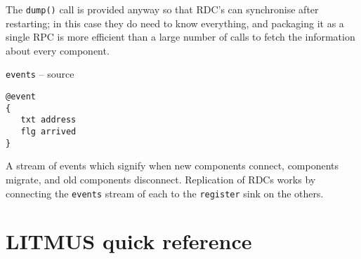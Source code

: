 \documentclass[12pt,a4paper,twoside]{article}
\renewcommand{\_}{\texttt{\symbol{95}}}
\begin{document}
\begin{bulletlist}
The \verb^dump()^ call is provided anyway so that RDC's can
synchronise after restarting; in this case they do need to know
everything, and packaging it as a single RPC is more efficient
than a large number of calls to fetch the information about
every component.

\item \texttt{events} -- source

\begin{verbatim}
@event
{
   txt address
   flg arrived
}
\end{verbatim}

A stream of events which signify when new components
connect, components migrate, and old components disconnect.
Replication of RDCs works by connecting the \verb^events^ stream
of each to the \verb^register^ sink on the others.

%
%
%
	
\end{bulletlist}

\appendix
\newpage
\section{LITMUS quick reference}
\end{document}
